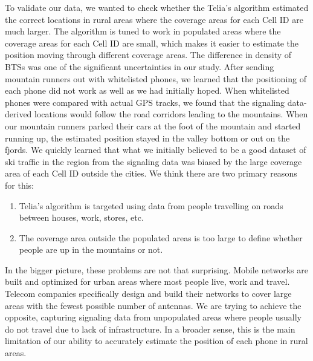 \documentclass[authordate,empirical]{jote-new-article}
\begin{document}
To validate our data, we wanted to check whether the Telia’s algorithm estimated the correct locations in rural areas where the coverage areas for each Cell ID are much larger. The algorithm is tuned to work in populated areas where the coverage areas for each Cell ID are small, which makes it easier to estimate the position moving through different coverage areas. The difference in density of BTSs was one of the significant uncertainties in our study. After sending mountain runners out with whitelisted phones, we learned that the positioning of each phone did not work as well as we had initially hoped. When whitelisted phones were compared with actual GPS tracks, we found that the signaling data-derived locations would follow the road corridors leading to the mountains. When our mountain runners parked their cars at the foot of the mountain and started running up, the estimated position stayed in the valley bottom or out on the fjords. We quickly learned that what we initially believed to be a good dataset of ski traffic in the region from the signaling data was biased by the large coverage area of each Cell ID outside the cities. We think there are two primary reasons for this:





\begin{enumerate}


  \item Telia’s algorithm is targeted using data from people travelling on roads between houses, work, stores, etc.



  \item
        The coverage area outside the populated areas is too large to define whether people are up in the mountains or not.


\end{enumerate}





In the bigger picture, these problems are not that surprising. Mobile networks are built and optimized for urban areas where most people live, work and travel. Telecom companies specifically design and build their networks to cover large areas with the fewest possible number of antennas. We are trying to achieve the opposite, capturing signaling data from unpopulated areas where people usually do not travel due to lack of infrastructure. In a broader sense, this is the main limitation of our ability to accurately estimate the position of each phone in rural areas.
\end{document}
